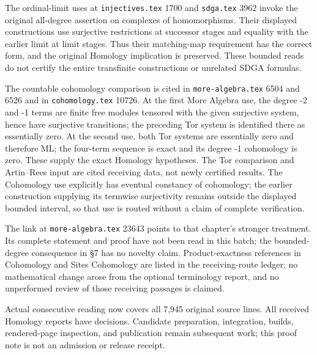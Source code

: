The ordinal-limit uses at \texttt{injectives.tex} 1700 and \texttt{sdga.tex} 3962 invoke the original all-degree assertion on complexes of homomorphisms. Their displayed constructions use surjective restrictions at successor stages and equality with the earlier limit at limit stages. Thus their matching-map requirement has the correct form, and the original Homology implication is preserved. These bounded reads do not certify the entire transfinite constructions or unrelated SDGA formulas.

The countable cohomology comparison is cited in \texttt{more-algebra.tex} 6504 and 6526 and in \texttt{cohomology.tex} 10726. At the first More Algebra use, the degree -2 and -1 terms are finite free modules tensored with the given surjective system, hence have surjective transitions; the preceding Tor system is identified there as essentially zero. At the second use, both Tor systems are essentially zero and therefore ML; the four-term sequence is exact and its degree -1 cohomology is zero. These supply the exact Homology hypotheses. The Tor comparison and Artin--Rees input are cited receiving data, not newly certified results. The Cohomology use explicitly has eventual constancy of cohomology; the earlier construction supplying its termwise surjectivity remains outside the displayed bounded interval, so that use is routed without a claim of complete verification.

The link at \texttt{more-algebra.tex} 23643 points to that chapter's stronger treatment. Its complete statement and proof have not been read in this batch; the bounded-degree consequence in §7 has no novelty claim. Product-exactness references in Cohomology and Sites Cohomology are listed in the receiving-route ledger; no mathematical change arose from the optional terminology report, and no unperformed review of those receiving passages is claimed.

Actual consecutive reading now covers all 7,945 original source lines. All received Homology reports have decisions. Candidate preparation, integration, builds, rendered-page inspection, and publication remain subsequent work; this proof note is not an admission or release receipt.
